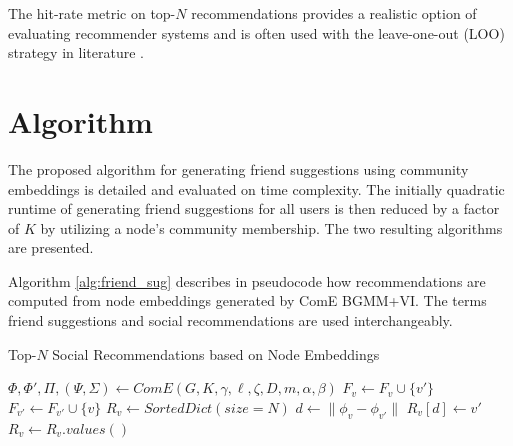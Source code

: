 \documentclass[conference]{IEEEtran}
\begin{document}
The hit-rate metric on top-$N$ recommendations provides a realistic option of evaluating recommender systems and is often used with the leave-one-out (LOO) strategy in literature \cite{Cremonesi2010PerformanceOR, Palumbo2017entity2rec, Zhao2019ATS, He2017NeuralCF}.


\section{Algorithm}

The proposed algorithm for generating friend suggestions using community embeddings is detailed and evaluated on time complexity. The initially quadratic runtime of generating friend suggestions for all users is then reduced by a factor of $K$ by utilizing a node's community membership. The two resulting algorithms are presented.

Algorithm \ref{alg:friend_sug} describes in pseudocode how recommendations are computed from node embeddings generated by ComE BGMM+VI. The terms friend suggestions and social recommendations are used interchangeably.

\begin{algorithm}
    \caption{Top-$N$ Social Recommendations based on Node Embeddings}
    \label{alg:friend_sug}
    \begin{algorithmic}[1]
        \State $\Phi, \Phi', \Pi, (\Psi,\Sigma) \leftarrow ComE(G, K, \gamma, \ell, \zeta, D, m, \alpha, \beta)$
        \State $F_v \leftarrow F_v \cup \{v'\}$
        \State $F_{v'} \leftarrow F_{v'} \cup \{v\}$
        \EndFor
        \State $R_v \leftarrow SortedDict(size=N)$
        \State $d \leftarrow \|\phi_v - \phi_{v'}\|$
        \State $R_v[d] \leftarrow v'$
        \EndFor
        \State $R_v  \leftarrow R_v.values()$
        \EndFor
    \end{algorithmic}
\end{algorithm}
\end{document}
